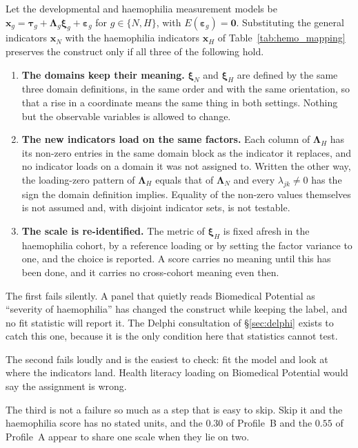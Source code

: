 \begin{assumption}
\label{ass:hem:substitution}
Let the developmental and haemophilia measurement models be
$\mathbf x_g=\boldsymbol\tau_g+\boldsymbol\Lambda_g\boldsymbol\xi_g+
\boldsymbol\varepsilon_g$ for $g\in\{N,H\}$, with
$E(\boldsymbol\varepsilon_g)=\mathbf 0$. Substituting the general indicators
$\mathbf x_N$ with the haemophilia indicators $\mathbf x_H$ of
Table~\ref{tab:hemo_mapping} preserves the construct only if all three of the
following hold.
\begin{enumerate}
  \item \textbf{The domains keep their meaning.} $\boldsymbol\xi_N$ and
  $\boldsymbol\xi_H$ are defined by the same three domain definitions, in the
  same order and with the same orientation, so that a rise in a coordinate
  means the same thing in both settings. Nothing but the observable variables
  is allowed to change.
  \item \textbf{The new indicators load on the same factors.} Each column of
  $\boldsymbol\Lambda_H$ has its non-zero entries in the same domain block as
  the indicator it replaces, and no indicator loads on a domain it was not
  assigned to. Written the other way, the loading-zero pattern of
  $\boldsymbol\Lambda_H$ equals that of $\boldsymbol\Lambda_N$ and every
  $\lambda_{jk}\ne0$ has the sign the domain definition implies. Equality of
  the non-zero values themselves is not assumed and, with disjoint indicator
  sets, is not testable.
  \item \textbf{The scale is re-identified.} The metric of
  $\boldsymbol\xi_H$ is fixed afresh in the haemophilia cohort, by a reference
  loading or by setting the factor variance to one, and the choice is
  reported. A score carries no meaning until this has been done, and it
  carries no cross-cohort meaning even then.
\end{enumerate}
\end{assumption}

\begin{reading}
The first fails silently. A panel that quietly reads Biomedical Potential as
``severity of haemophilia'' has changed the construct while keeping the label,
and no fit statistic will report it. The Delphi consultation of
\S\ref{sec:delphi} exists to catch this one, because it is the only condition
here that statistics cannot test.

The second fails loudly and is the easiest to check: fit the model and look at
where the indicators land. Health literacy loading on Biomedical Potential
would say the assignment is wrong.

The third is not a failure so much as a step that is easy to skip. Skip it and
the haemophilia score has no stated units, and the $0.30$ of Profile~B and
the $0.55$ of Profile~A appear to share one scale when they lie on two.
\end{reading}

